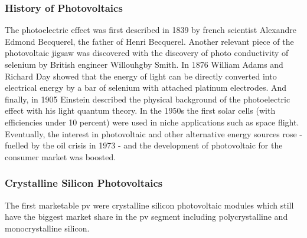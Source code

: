 \subsubsection{History of Photovoltaics}
The photoelectric effect was first described in 1839 by french scientist Alexandre Edmond Becquerel\cite{becquerel1839memoire}, the father of Henri Becquerel. 
Another relevant piece of the photovoltaic jigsaw was discovered 
with the discovery of photo conductivity of selenium
by British engineer Willouhgby Smith\cite{Smith1873Selenium}.
In 1876 William Adams and Richard Day\cite{Adams1876Selenium} showed that 
the energy of light can be directly converted into electrical energy by a bar of 
selenium with attached platinum electrodes.
And finally, in 1905 Einstein described the physical background of the photoelectric 
effect with his light quantum theory\cite{einstein1905erzeugung}.
In the 1950s the first solar cells (with efficiencies under 10 percent) were used in niche applications such as space flight. 
Eventually, the interest in photovoltaic and other alternative energy sources 
rose - fuelled by the oil crisis in 1973 - 
and the development of photovoltaic for the consumer market was boosted. \\

\subsubsection{Crystalline Silicon Photovoltaics}
The first marketable \gls{pv} were crystalline silicon photovoltaic modules which still have the biggest market share in the \gls{pv} segment including polycrystalline and monocrystalline silicon.

